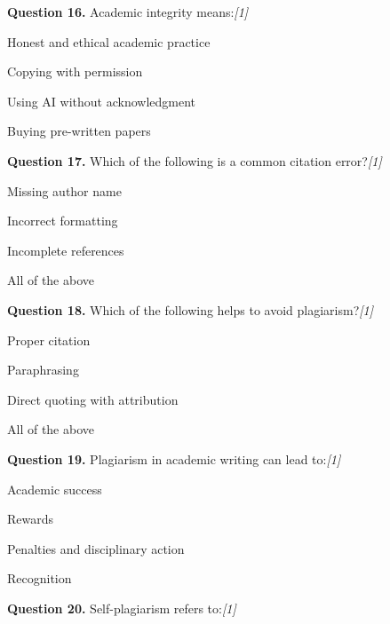 \documentclass[11pt,a4paper]{article}
\newcommand{\pts}[1]{\hfill   \textit{[#1]}}
\begin{document}
\noindent   \textbf{Question 16.} Academic integrity means:\pts{1}

\begin{parts}
  \item Honest and ethical academic practice
  \item Copying with permission
  \item Using AI without acknowledgment
  \item Buying pre-written papers
\end{parts}

\medskip




\noindent   \textbf{Question 17.} Which of the following is a common citation error?\pts{1}

\begin{parts}
  \item Missing author name
  \item Incorrect formatting
  \item Incomplete references
  \item All of the above
\end{parts}

\medskip




\noindent   \textbf{Question 18.} Which of the following helps to avoid plagiarism?\pts{1}

\begin{parts}
  \item Proper citation
  \item Paraphrasing
  \item Direct quoting with attribution
  \item All of the above
\end{parts}

\medskip




\noindent   \textbf{Question 19.} Plagiarism in academic writing can lead to:\pts{1}

\begin{parts}
  \item Academic success
  \item Rewards
  \item Penalties and disciplinary action
  \item Recognition
\end{parts}

\medskip




\noindent   \textbf{Question 20.} Self-plagiarism refers to:\pts{1}
\end{document}
